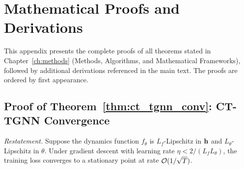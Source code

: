
\chapter{Mathematical Proofs and Derivations}
\label{app:proofs}

This appendix presents the complete proofs of all theorems stated in Chapter~\ref{ch:methods} (Methods, Algorithms, and Mathematical Frameworks), followed by additional derivations referenced in the main text. The proofs are ordered by first appearance.


\section{Proof of Theorem~\ref{thm:ct_tgnn_conv}: CT-TGNN Convergence}
\label{app:proof_ct_conv}

\noindent\textit{Restatement.} Suppose the dynamics function $f_\theta$ is $L_f$-Lipschitz in $\mathbf{h}$ and $L_\theta$-Lipschitz in $\theta$. Under gradient descent with learning rate $\eta<2/(L_f L_\theta)$, the training loss converges to a stationary point at rate $\mathcal{O}(1/\sqrt{T})$.

